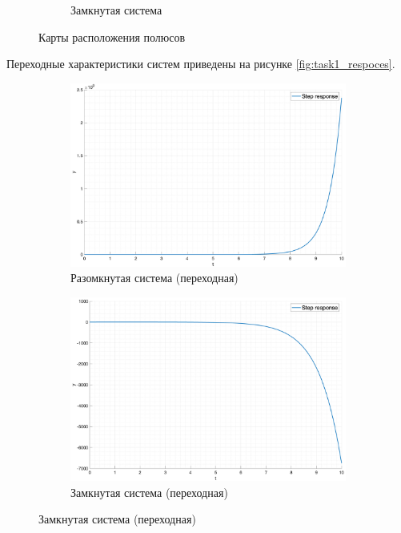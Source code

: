 \begin{figure}[ht!]
\begin{subfigure}{0.5\textwidth}
        \caption{Замкнутая система}
        \label{fig:task1_poles:closed}
    \end{subfigure}
    \caption{Карты расположения полюсов}
    \label{fig:task1_poles}
\end{figure}

Переходные характеристики систем приведены на рисунке \ref{fig:task1_respoces}.
\begin{figure}[ht!]
    \centering
    \begin{subfigure}{0.5\textwidth}
        \includegraphics[width=\textwidth]{media/plots/task1_step_response_open.png}
        \caption{Разомкнутая система (переходная)}
        \label{fig:task1_step:open}
    \end{subfigure}%
    \begin{subfigure}{0.5\textwidth}
        \includegraphics[width=\textwidth]{media/plots/task1_step_response_closed.png}
        \caption{Замкнутая система (переходная)}

\end{subfigure}
\end{figure}
